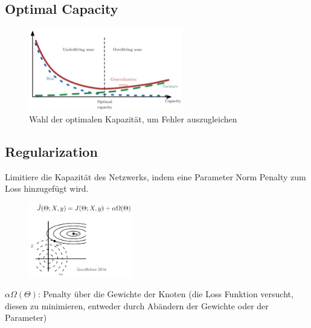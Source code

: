 \documentclass[a4paper]{article}
\begin{document}
		\subsection{Optimal Capacity}
		
		\begin{figure}[htb!]
			\centering
			\includegraphics[width=0.6\textwidth]{img/06_deep_nn/optimal_capacity.png}
			\caption{Wahl der optimalen Kapazität, um Fehler auszugleichen}
			\label{fig:06_deep_nn_optimal_capacity}
		\end{figure}
	
		\subsection{Regularization}
	\noindent
		Limitiere die Kapazität des Netzwerks, indem eine Parameter Norm Penalty zum Loss hinzugefügt wird.
		
		\begin{figure}[htb!]
			\centering
			\includegraphics[width=0.4\textwidth]{img/06_deep_nn/regularization.png}
		\end{figure}
	\noindent
		$\alpha \Omega(\Theta)$: Penalty über die Gewichte der Knoten (die Loss Funktion versucht, diesen zu minimieren, entweder durch Abändern der Gewichte oder der Parameter)
	
\end{document}
